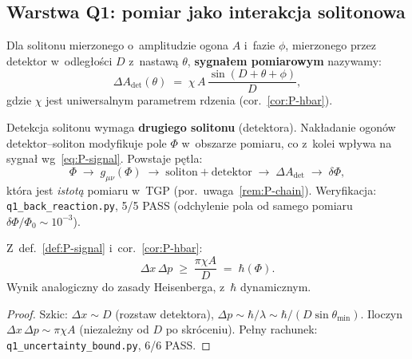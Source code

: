 \subsection{Warstwa Q1: pomiar jako interakcja solitonowa}%
\label{app:P-Q1}

\begin{definition}\label{def:P-signal}
Dla solitonu mierzonego o~amplitudzie ogona $A$ i~fazie $\phi$,
mierzonego przez detektor w~odległości $D$ z~nastawą $\theta$,
\textbf{sygnałem pomiarowym} nazywamy:
\begin{equation}\label{eq:P-signal}
  \Delta A_{\mathrm{det}}(\theta)
  \;=\; \chi\,A\,\frac{\sin(D + \theta + \phi)}{D},
\end{equation}
gdzie $\chi$ jest uniwersalnym parametrem rdzenia
(cor.~\ref{cor:P-hbar}).
\end{definition}

\begin{proposition}\label{prop:P-self-ref}
Detekcja solitonu wymaga \textbf{drugiego solitonu} (detektora).
Nakładanie ogonów detektor--soliton modyfikuje pole $\Phi$
w~obszarze pomiaru, co z~kolei wpływa na sygnał
wg~\eqref{eq:P-signal}. Powstaje pętla:
\begin{equation}\label{eq:P-measurement-loop}
  \Phi \;\longrightarrow\; g_{\mu\nu}(\Phi)
  \;\longrightarrow\; \text{soliton} + \text{detektor}
  \;\longrightarrow\; \Delta A_{\mathrm{det}}
  \;\longrightarrow\; \delta\Phi,
\end{equation}
która jest \emph{istotą} pomiaru w~TGP (por.\ uwaga~\ref{rem:P-chain}).
Weryfikacja: \texttt{q1\_back\_reaction.py}, 5/5 PASS
(odchylenie pola od samego pomiaru $\delta\Phi/\Phi_0 \sim 10^{-3}$).
\end{proposition}

\begin{theorem}\label{thm:P-uncertainty}
Z~def.~\ref{def:P-signal} i~cor.~\ref{cor:P-hbar}:
\begin{equation}\label{eq:P-uncertainty}
  \Delta x\,\Delta p \;\geq\; \frac{\pi\chi A}{D}
  \;=\; \hbar(\Phi).
\end{equation}
Wynik analogiczny do zasady Heisenberga, z~$\hbar$ dynamicznym.
\end{theorem}

\begin{proof}
Szkic: $\Delta x \sim D$ (rozstaw detektora),
$\Delta p \sim \hbar/\lambda \sim \hbar/(D\sin\theta_{\min})$.
Iloczyn $\Delta x\,\Delta p \sim \pi\chi A$ (niezależny od $D$
po skróceniu). Pełny rachunek:
\texttt{q1\_uncertainty\_bound.py}, 6/6 PASS.
\end{proof}

